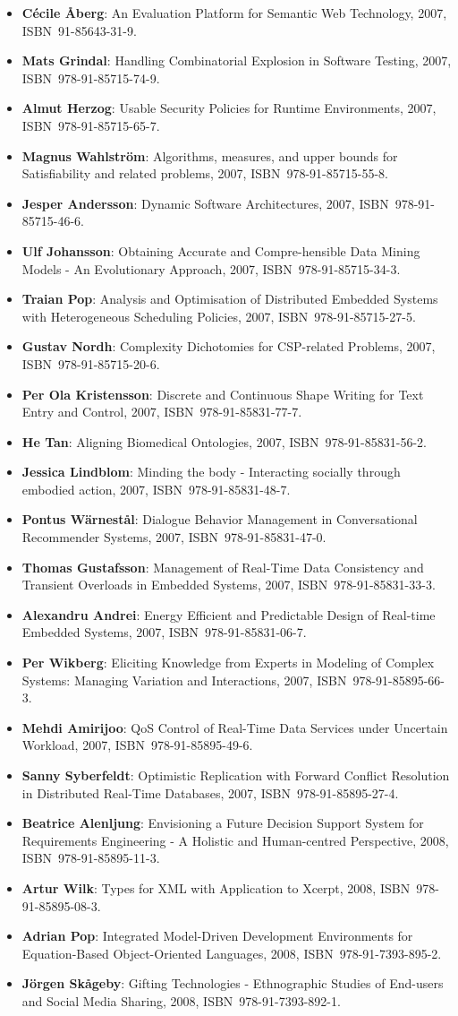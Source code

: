 \documentclass[a4paper,showtrims,twocolumn]{memoir}
\newenvironment{theses}{
  \begin{itemize}
    \setlength{\itemsep}{0.2em}
    \setlength{\parskip}{0em}
    \setlength{\parsep}{0em}
}{
  \end{itemize}
}
\newcommand{\thesis}[5]{\item[No. #1] \textbf{#2}: #3, #4, ISBN~#5.}
\begin{document}
\begin{theses}
    \thesis{1061}{Cécile Åberg}{An Evaluation Platform for Semantic Web Technology}{2007}{91-85643-31-9}
    \thesis{1073}{Mats Grindal}{Handling Combinatorial Explosion in Software Testing}{2007}{978-91-85715-74-9}
    \thesis{1075}{Almut Herzog}{Usable Security Policies for Runtime Environments}{2007}{978-91-85715-65-7}
    \thesis{1079}{Magnus Wahlström}{Algorithms, measures, and upper bounds for Satisfiability and related problems}{2007}{978-91-85715-55-8}
    \thesis{1083}{Jesper Andersson}{Dynamic Software Architectures}{2007}{978-91-85715-46-6}
    \thesis{1086}{Ulf Johansson}{Obtaining Accurate and Compre-hensible Data Mining Models - An Evolutionary Approach}{2007}{978-91-85715-34-3}
    \thesis{1089}{Traian Pop}{Analysis and Optimisation of Distributed Embedded Systems with Heterogeneous Scheduling Policies}{2007}{978-91-85715-27-5}
    \thesis{1091}{Gustav Nordh}{Complexity Dichotomies for CSP-related Problems}{2007}{978-91-85715-20-6}
    \thesis{1106}{Per Ola Kristensson}{Discrete and Continuous Shape Writing for Text Entry and Control}{2007}{978-91-85831-77-7}
    \thesis{1110}{He Tan}{Aligning Biomedical Ontologies}{2007}{978-91-85831-56-2}
    \thesis{1112}{Jessica Lindblom}{Minding the body - Interacting socially through embodied action}{2007}{978-91-85831-48-7}
    \thesis{1113}{Pontus Wärnestål}{Dialogue Behavior Management in Conversational Recommender Systems}{2007}{978-91-85831-47-0}
    \thesis{1120}{Thomas Gustafsson}{Management of Real-Time Data Consistency and Transient Overloads in Embedded Systems}{2007}{978-91-85831-33-3}
    \thesis{1127}{Alexandru Andrei}{Energy Efficient and Predictable Design of Real-time Embedded Systems}{2007}{978-91-85831-06-7}
    \thesis{1139}{Per Wikberg}{Eliciting Knowledge from Experts in Modeling of Complex Systems: Managing Variation and Interactions}{2007}{978-91-85895-66-3}
    \thesis{1143}{Mehdi Amirijoo}{QoS Control of Real-Time Data Services under Uncertain Workload}{2007}{978-91-85895-49-6}
    \thesis{1150}{Sanny Syberfeldt}{Optimistic Replication with Forward Conflict Resolution in Distributed Real-Time Databases}{2007}{978-91-85895-27-4}
    \thesis{1155}{Beatrice Alenljung}{Envisioning a Future Decision Support System for Requirements Engineering - A Holistic and Human-centred Perspective}{2008}{978-91-85895-11-3}
    \thesis{1156}{Artur Wilk}{Types for XML with Application to Xcerpt}{2008}{978-91-85895-08-3}
    \thesis{1183}{Adrian Pop}{Integrated Model-Driven Development Environments for Equation-Based Object-Oriented Languages}{2008}{978-91-7393-895-2}
    \thesis{1185}{Jörgen Skågeby}{Gifting Technologies - Ethnographic Studies of End-users and Social Media Sharing}{2008}{978-91-7393-892-1}

\end{theses}
\end{document}
